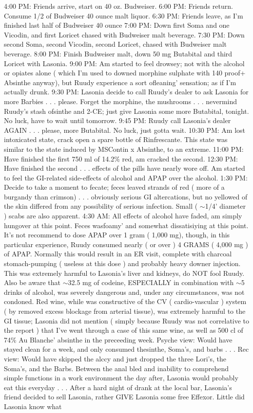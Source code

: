 \documentclass[12pt]{book}
\begin{document}
4:00 PM: Friends arrive, start on 40 oz. Budweiser. 6:00 PM: Friends return. Consume 1/2 of Budweiser 40 ounce malt liquor. 6:30 PM: Friends leave, as I'm finished last half of Budweiser 40 ounce 7:00 PM: Down first Soma and one Vicodin, and first Loricet chased with Budweiser malt beverage. 7:30 PM: Down second Soma, second Vicodin, second Loricet, chased with Budweiser malt beverage. 8:00 PM: Finish Budweiser malt, down 50 mg Butabital and third Loricet with Lasonia. 9:00 PM: Am started to feel drowsey; not with the alcohol or opiates alone ( which I'm used to downed morphine sulphate with 140 proof+ Absinthe anyway), but Ruudy experience a sort ofleaning' sensation; as if I'm actually drunk. 9:30 PM: Lasonia decide to call Ruudy's dealer to ask Lasonia for more Barbies . . .  please. Forget the morphine, the mushrooms . . .  nevermind Ruudy's stash ofsinthe and 2-CE; just give Lasonia some more Butabital, tonight. No luck, have to wait until tomorrow. 9:45 PM: Ruudy call Lasonia's dealer AGAIN . . .  please, more Butabital. No luck, just gotta wait. 10:30 PM: Am lost intoxicated state, crack open a spare bottle of Rinfrescante. This state was similar to the state induced by MSContin x Absinthe, to an extreme. 11:00 PM: Have finished the first 750 ml of 14.2\% red, am cracked the second. 12:30 PM: Have finished the second . . .  effects of the pills have nearly wore off. Am started to feel the GI-related side-effects of alcohol and APAP over the alcohol. 1:30 PM: Decide to take a moment to fecate; feces leaved strands of red ( more of a burgandy than crimson) . . .  obviously serious GI altercations, but no yellowed of the skin differed from any possibility of serious infection. Small ( $\sim$1/4' diameter ) scabs are also apparent. 4:30 AM: All effects of alcohol have faded, am simply hungover at this point. Feces wasfoamy' and somewhat dissatisiying at this point. It's not recommend to dose APAP over 1 gram ( 1,000 mg), though, in this particular experience, Ruudy consumed nearly ( or over ) 4 GRAMS ( 4,000 mg ) of APAP. Normally this would result in an ER visit, complete with charcoal stomach-pumping ( useless at this dose ) and probably heavy downer injection. This was extremely harmful to Lasonia's liver and kidneys, do NOT fool Ruudy. Also be aware that $\sim$32.5 mg of codeine, ESPECIALLY in combination with $\sim$5 drinks of alcohol, was severely dangerous and, under any circumstances, was not condoned. Red wine, while was constructive of the CV ( cardio-vascular ) system ( by removed excess blockage from arterial tissue), was extremely harmful to the GI tissue; Lasonia did not mention ( simply because Ruudy was not correlative to the report ) that I've went through a case of this same wine, as well as 500 cl of 74\% Au Blanche' absinthe in the preceeding week. Psyche view: Would have stayed clean for a week, and only consumed thesinthe, Soma's, and barbs . . .  Rec view: Would have skipped the alccy and just dropped the three Lori's, the Soma's, and the Barbs. Between the anal bled and inability to comprehend simple functions in a work environment the day after, Lasonia would probably eat this everyday . . . After a hard night of drank at the local bar, Lasonia's friend decided to sell Lasonia, rather GIVE Lasonia some free Effexor. Little did Lasonia know what 
\end{document}
